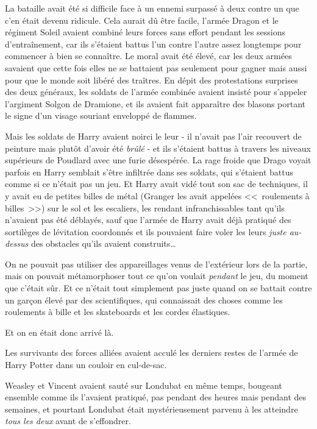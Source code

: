 La bataille avait été si difficile face à un ennemi surpassé à deux contre un que c'en était devenu ridicule. Cela aurait dû être facile, l'armée Dragon et le régiment Soleil avaient combiné leurs forces sans effort pendant les sessions d'entraînement, car ils s'étaient battus l'un contre l'autre assez longtemps pour commencer à bien se connaître. Le moral avait été élevé, car les deux armées savaient que cette fois elles ne se battaient pas seulement pour gagner mais aussi pour que le monde soit libéré des traîtres. En dépit des protestations surprises des deux généraux, les soldats de l'armée combinée avaient insisté pour s'appeler l'argiment Solgon de Dramione, et ils avaient fait apparaître des blasons portant le signe d'un visage souriant enveloppé de flammes.

Mais les soldats de Harry avaient noirci le leur - il n'avait pas l'air recouvert de peinture mais plutôt d'avoir été \emph{brûlé} - et ils s'étaient battus à travers les niveaux supérieurs de Poudlard avec une furie désespérée. La rage froide que Drago voyait parfois en Harry semblait s'être infiltrée dans ses soldats, qui s'étaient battus comme si ce n'était pas un jeu. Et Harry avait vidé tout son sac de techniques, il y avait eu de petites billes de métal (Granger les avait appelées <<~roulements à billes~>>) sur le sol et les escaliers, les rendant infranchissables tant qu'ils n'avaient pas été déblayés, sauf que l'armée de Harry avait déjà pratiqué des sortilèges de lévitation coordonnés et ils pouvaient faire voler les leurs \emph{juste au-dessus} des obstacles qu'ils avaient construits…

On ne pouvait pas utiliser des appareillages venus de l'extérieur lors de la partie, mais on pouvait métamorphoser tout ce qu'on voulait \emph{pendant} le jeu, du moment que c'était sûr. Et ce n'était tout simplement pas juste quand on se battait contre un garçon élevé par des scientifiques, qui connaissait des choses comme les roulements à bille et les skateboards et les cordes élastiques.

Et on en était donc arrivé là.

Les survivants des forces alliées avaient acculé les derniers restes de l'armée de Harry Potter dans un couloir en cul-de-sac.

Weasley et Vincent avaient sauté sur Londubat en même temps, bougeant ensemble comme ils l'avaient pratiqué, pas pendant des heures mais pendant des semaines, et pourtant Londubat était mystérieusement parvenu à les atteindre \emph{tous les deux} avant de s'effondrer.

